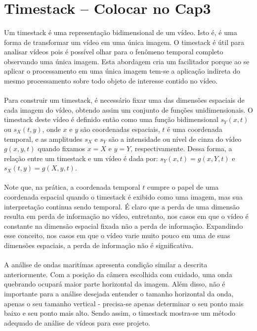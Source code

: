 \section{Timestack – Colocar no Cap3}
\paragraph{}Um timestack é uma representação bidimensional de um vídeo. Isto é, é uma forma de transformar um vídeo em uma única imagem. O timestack é útil para analisar vídeos pois é possível olhar para o fenômeno temporal completo observando uma única imagem. Esta abordagem cria um facilitador porque ao se aplicar o processamento em uma única imagem tem-se a aplicação indireta do mesmo processamento sobre todo objeto de interesse contido no vídeo.
\paragraph{}Para construir um timestack, é necessário fixar uma das dimensões espaciais de cada imagem do vídeo, obtendo assim um conjunto de funções unidimensionais. O timestack deste vídeo é definido então como uma função bidimensional \(s_{Y}(x,t)\) ou \(s_{X}(t,y)\), onde \(x\) e \(y\) são coordenadas espaciais, \(t\) é uma coordenada temporal, e as amplitudes \(s_{X}\) e \(s_{Y}\) são a intensidade ou nível de cinza do vídeo \(g(x,y,t)\) quando fixamos \(x = X\) e \(y = Y\), respectivamente. Dessa forma, a relação entre um timestack e um vídeo é dada por: \(s_{Y}(x,t)=g(x,Y,t)\) e \(s_{X}(t,y) = g(X,y,t)\).
\paragraph{}Note que, na prática, a coordenada temporal \(t\) cumpre o papel de uma coordenada espacial quando o timestack é exibido como uma imagem, mas sua interpretação continua sendo temporal. É claro que a perda de uma dimensão resulta em perda de informação no vídeo, entretanto, nos casos em que o vídeo é constante na dimensão espacial fixada não a perda de informação. Expandindo esse conceito, nos casos em que o vídeo varie muito pouco em uma de suas dimensões espaciais, a perda de informação não é significativa.
\paragraph{}A análise de ondas maritímas apresenta condição similar a descrita anteriormente. Com a posição da câmera escolhida com cuidado, uma onda quebrando ocupará maior parte horizontal da imagem. Além disso, não é importante para a análise desejada entender o tamanho horizontal da onda, apenas o seu tamanho vertical - precisa-se apenas determinar o seu ponto mais baixo e seu ponto mais alto. Sendo assim, o timestack mostra-se um método adequado de análise de vídeos para esse projeto.
